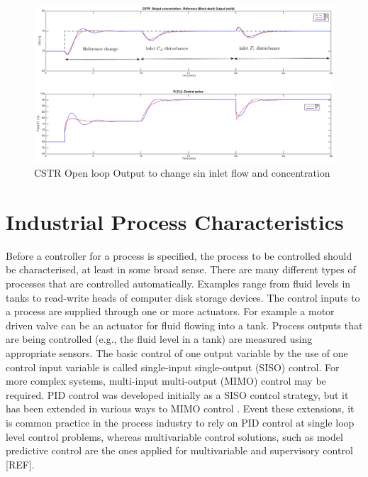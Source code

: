 \begin{figure}[htb!]
\centering
\includegraphics[width=1\linewidth]{../figuras/Ch2FigureClosedLoop}
\caption{CSTR Open loop Output to change sin inlet flow and concentration} 
\label{Ch2fig:CSTRFigureClosedLoop}
\end{figure}


\section{Industrial Process Characteristics}
\label{sec:2}

Before a controller for a process is specified, the process to be controlled should be characterised, at least in some broad sense. There are many different types of processes that are controlled automatically. Examples range from fluid levels in tanks to read-write heads of computer disk storage devices. The control inputs to a process are supplied through one or more actuators. For example a motor driven valve can be an actuator for fluid flowing into a tank. Process outputs that are being controlled (e.g., the fluid level in a tank) are measured using appropriate sensors. The basic control of one output variable by the use of one control input variable is called single-input single-output (SISO) control. For more complex systems, multi-input multi-output (MIMO) control may be required. PID control was developed initially as a SISO control strategy, but it has been extended in various ways to MIMO control \cite{wang2008}. Event these extensions, it is common practice in the process industry to rely on PID control at single loop level control problems, whereas multivariable control solutions, such as model predictive control are the ones applied for multivariable and supervisory control [REF].\\


